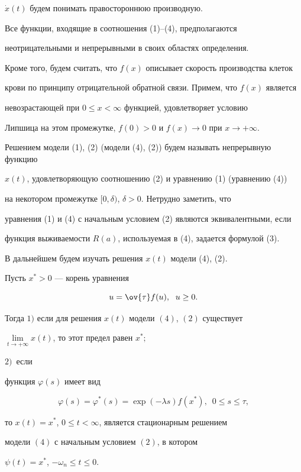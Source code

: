 $\Dot{x}(t)$ будем понимать правостороннюю производную.


Все функции, входящие в соотношения (1)--(4), предполагаются


неотрицательными и непрерывными в своих областях определения.


Кроме того, будем считать, что $f(x)$ описывает скорость производства клеток


крови по принципу отрицательной обратной связи. Примем, что $f(x)$ является


невозрастающей при $0 \leq x < \infty$ функцией, удовлетворяет условию


Липшица на этом промежутке, $f(0) > 0$ и $f(x) \to 0$ при $x \to+\infty$.


Решением модели (1), (2) (модели (4), (2)) будем называть непрерывную функцию


$x(t)$, удовлетворяющую соотношению (2) и уравнению (1) (уравнению (4))


на некотором промежутке $[0, \delta)$, $\delta > 0$. Нетрудно заметить, что


уравнения (1) и (4) с начальным условием (2) являются эквивалентными, если


функция выживаемости $R(a)$, используемая в (4), задается формулой (3).


В дальнейшем будем изучать решения $x(t)$ модели (4), (2).





\begin{lem}


Пусть $x^{*} > 0$ --- корень уравнения


\begin{equation}


u=\ov{\tau} f(u), \ \; u \geq 0.


\end{equation}


Тогда $1)$ если для решения $x(t)$ модели $(4)$, $(2)$ существует


$\lim\limits_{t\to+\infty} x(t)$, то этот предел равен $x^{*};$


$2)$~если


функция $\varphi(s)$ имеет вид


\begin{equation}


\varphi(s)=\varphi^{*}(s)=\exp(- \lambda s) f(x^{*}),


\ \; 0 \leq s \leq \tau,


\end{equation}


то $x(t)=x^{*}$, $0 \leq t < \infty$, является стационарным решением


модели $(4)$ с начальным условием $(2)$, в котором


$\psi(t)=x^{*}$, $- \omega_{n} \leq t \leq 0$.


\end{lem}





